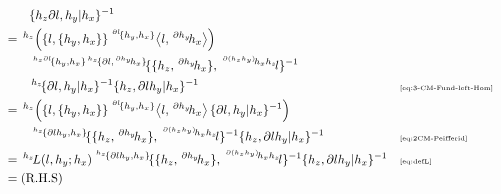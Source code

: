 \documentclass[11pt, reqno]{amsart} %
\newcommand{\act}[1]{\,\sp{#1}\!}
\theoremstyle{definition}
\theoremstyle{remark}
\numberwithin{equation}{section}
\begin{document}
\begin{align*}
  &\qquad 
  \{h_z\partial l,h_y|h_x\}^{-1} \\
  &= \act{h_z}\left(\{l,\{h_y,h_x\}\}\act{\act{\partial l}\{h_y,h_x\}}\left<l,\act{\partial h_y}h_x\right>\right) \\
  &\qquad \act{\act{h_z\partial l}\{h_y,h_x\}\act{h_z}\{\partial l,\act{\partial h_y}h_x\}}\{\{h_z,\act{\partial h_y}h_x\},\act{\act{\partial (h_zh_y)}h_xh_z}l\}^{-1} \\
  &\qquad \act{h_z}\{\partial l,h_y|h_x\}^{-1}\{h_z,\partial lh_y|h_x\}^{-1} & &\text{\tiny \eqref{eq:3-CM-Fund-left-Hom}} \\
  &= \act{h_z}\left(\{l,\{h_y,h_x\}\}\act{\act{\partial l}\{h_y,h_x\}}\left<l,\act{\partial h_y}h_x\right>\{\partial l,h_y|h_x\}^{-1}\right) \\
  &\qquad \act{\act{h_z}\{\partial lh_y,h_x\}}\{\{h_z,\act{\partial h_y}h_x\},\act{\act{\partial (h_zh_y)}h_xh_z}l\}^{-1}\{h_z,\partial lh_y|h_x\}^{-1} & &\text{\tiny \eqref{eq:2CM-Peifferid}} \\
  &= \act{h_z}L(l,h_y;h_x)\act{\act{h_z}\{\partial lh_y,h_x\}}\{\{h_z,\act{\partial h_y}h_x\},\act{\act{\partial (h_zh_y)}h_xh_z}l\}^{-1}\{h_z,\partial lh_y|h_x\}^{-1} & &\text{\tiny \eqref{eq:defL}} \\
  &= (\text{R.H.S})
\end{align*}
\end{document}
